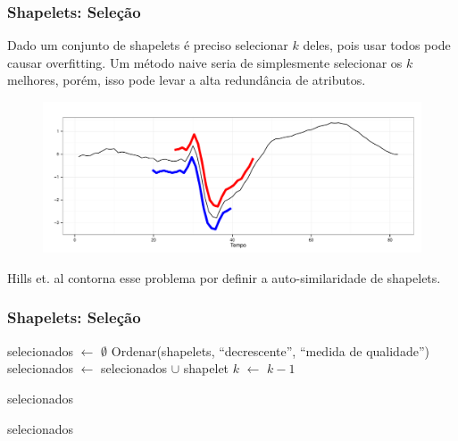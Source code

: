 \documentclass{beamer}
\begin{document}

\begin{frame}
\frametitle{Shapelets: Sele{\c c}{\~a}o}

Dado um conjunto de shapelets {\'e} preciso selecionar $k$ deles, pois usar todos pode causar overfitting. Um m{\'e}todo naive seria de simplesmente selecionar os $k$ melhores, por{\'e}m, isso pode levar a alta redund{\^a}ncia de atributos.

\begin{figure}
\includegraphics[width=0.7\linewidth]{images/shapelets-similares.pdf}
\end{figure}

Hills et. al \cite{Hills:2013dk} contorna esse problema por definir a auto-similaridade de shapelets.
\end{frame}


\begin{frame}
\frametitle{Shapelets: Sele{\c c}{\~a}o}
\begin{algorithmic}
\small
{}
	\State selecionados $\leftarrow$ $\emptyset$
    \State Ordenar(shapelets, ``decrescente'', ``medida de qualidade'')
        	\State selecionados $\leftarrow$ selecionados $\cup$ shapelet
            \State $k$ $\leftarrow$ $k - 1$
        \EndIf
        
        	\State \Return selecionados
        \EndIf
    \EndFor
    
    \State \Return selecionados
\EndFunction
\end{algorithmic}
\end{frame}

\end{document}

